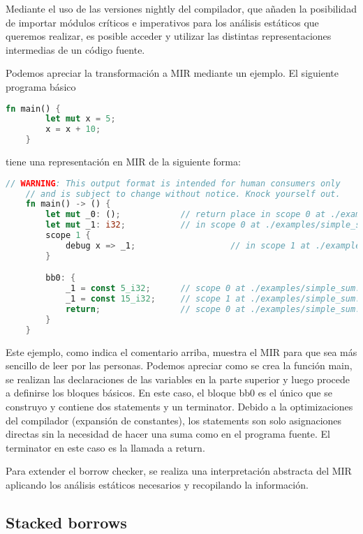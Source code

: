 Mediante el uso de las versiones nightly del compilador, que añaden la posibilidad de importar módulos críticos e imperativos para los análisis estáticos que queremos realizar, es posible acceder y utilizar las distintas representaciones intermedias de un código fuente.

Podemos apreciar la transformación a MIR mediante un ejemplo. El siguiente programa básico
\begin{lstlisting}[language=Rust]
    fn main() {
        let mut x = 5;
        x = x + 10;
    }
\end{lstlisting}
tiene una representación en MIR de la siguiente forma:
\begin{lstlisting}[language=Rust]
    // WARNING: This output format is intended for human consumers only
    // and is subject to change without notice. Knock yourself out.
    fn main() -> () {
        let mut _0: ();            // return place in scope 0 at ./examples/simple_sum.rs:1:11: 1:11
        let mut _1: i32;           // in scope 0 at ./examples/simple_sum.rs:2:9: 2:14
        scope 1 {
            debug x => _1;                   // in scope 1 at ./examples/simple_sum.rs:2:9: 2:14
        }

        bb0: {
            _1 = const 5_i32;      // scope 0 at ./examples/simple_sum.rs:2:17: 2:18
            _1 = const 15_i32;     // scope 1 at ./examples/simple_sum.rs:3:5: 3:15
            return;                // scope 0 at ./examples/simple_sum.rs:4:2: 4:2
        }
    }
\end{lstlisting}

Este ejemplo, como indica el comentario arriba, muestra el MIR para que sea más sencillo de leer por las personas. Podemos apreciar como se crea la función main, se realizan las declaraciones de las variables en la parte superior y luego procede a definirse los bloques básicos. En este caso, el bloque bb0 es el único que se construyo y contiene dos statements y un terminator. Debido a la optimizaciones del compilador (expansión de constantes), los statements son solo asignaciones directas sin la necesidad de hacer una suma como en el programa fuente. El terminator en este caso es la llamada a return.

Para extender el borrow checker, se realiza una interpretación abstracta del MIR aplicando los análisis estáticos necesarios y recopilando la información.

\subsection{Stacked borrows}

